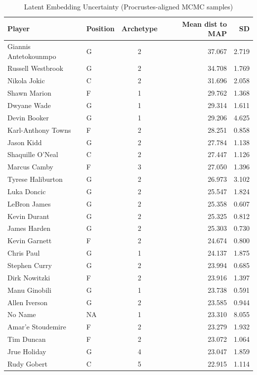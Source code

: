 \begin{table}[t]
\caption*{
{\fontsize{20}{25}\selectfont  Latent Embedding Uncertainty (Procrustes-aligned MCMC samples)\fontsize{12}{15}\selectfont }
} 
\fontsize{12.0pt}{14.0pt}\selectfont
\begin{tabular*}{\linewidth}{@{\extracolsep{\fill}}llcrr}
\toprule
Player & Position & Archetype & Mean dist to MAP & SD \\ 
\midrule\addlinespace[2.5pt]
Giannis Antetokounmpo & G & 2 & 37.067 & 2.719 \\ 
Russell Westbrook & G & 2 & 34.708 & 1.769 \\ 
Nikola Jokic & C & 2 & 31.696 & 2.058 \\ 
Shawn Marion & F & 1 & 29.762 & 1.368 \\ 
Dwyane Wade & G & 1 & 29.314 & 1.611 \\ 
Devin Booker & G & 1 & 29.206 & 4.625 \\ 
Karl-Anthony Towns & F & 2 & 28.251 & 0.858 \\ 
Jason Kidd & G & 2 & 27.784 & 1.138 \\ 
Shaquille O'Neal & C & 2 & 27.447 & 1.126 \\ 
Marcus Camby & F & 3 & 27.050 & 1.396 \\ 
Tyrese Haliburton & G & 2 & 26.973 & 3.102 \\ 
Luka Doncic & G & 2 & 25.547 & 1.824 \\ 
LeBron James & G & 2 & 25.358 & 0.607 \\ 
Kevin Durant & G & 2 & 25.325 & 0.812 \\ 
James Harden & G & 2 & 25.303 & 0.730 \\ 
Kevin Garnett & F & 2 & 24.674 & 0.800 \\ 
Chris Paul & G & 1 & 24.137 & 1.875 \\ 
Stephen Curry & G & 2 & 23.994 & 0.685 \\ 
Dirk Nowitzki & F & 2 & 23.916 & 1.397 \\ 
Manu Ginobili & G & 1 & 23.738 & 0.591 \\ 
Allen Iverson & G & 2 & 23.585 & 0.944 \\ 
No Name & NA & 1 & 23.310 & 8.055 \\ 
Amar'e Stoudemire & F & 2 & 23.279 & 1.932 \\ 
Tim Duncan & F & 2 & 23.072 & 1.064 \\ 
Jrue Holiday & G & 4 & 23.047 & 1.859 \\ 
Rudy Gobert & C & 5 & 22.915 & 1.114 \\ 

\end{tabular*}
\end{table}
